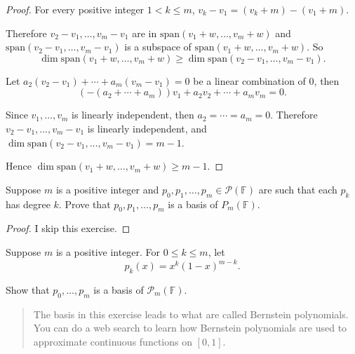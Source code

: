 \begin{proof}
    For every positive integer $1 < k \leq m$, $v_{k} - v_{1} = (v_{k} + m) - (v_{1} + m)$.

    Therefore $v_{2} - v_{1}, \ldots, v_{m} - v_{1}$ are in $\text{span}(v_{1} + w, \ldots, v_{m} + w)$ and $\text{span}(v_{2} - v_{1}, \ldots, v_{m} - v_{1})$ is a subspace of $\text{span}(v_{1} + w, \ldots, v_{m} + w)$. So
    \[
        \dim \text{span}(v_{1}+w, \ldots, v_{m}+w) \geq \dim\text{span}(v_{2} - v_{1}, \ldots, v_{m} - v_{1}).
    \]

    Let $a_{2}(v_{2} - v_{1}) + \cdots + a_{m}(v_{m} - v_{1}) = 0$ be a linear combination of $0$, then
    \[
        (-(a_{2} + \cdots + a_{m}))v_{1} + a_{2}v_{2} + \cdots + a_{m}v_{m} = 0.
    \]

    Since $v_{1}, \ldots, v_{m}$ is linearly independent, then $a_{2} = \cdots = a_{m} = 0$. Therefore $v_{2} - v_{1}, \ldots, v_{m} - v_{1}$ is linearly independent, and $\dim \text{span}(v_{2} - v_{1}, \ldots, v_{m} - v_{1}) = m - 1$.

    Hence $\dim \text{span}(v_{1} + w, \ldots, v_{m} + w)\geq m - 1$.
\end{proof}

\begin{exercise}
    Suppose $m$ is a positive integer and $p_{0}, p_{1}, \ldots, p_{m} \in \mathcal{P}(\mathbb{F})$ are such that each $p_{k}$ has degree $k$. Prove that $p_{0}, p_{1}, \ldots, p_{m}$ is a basis of $P_{m} (\mathbb{F})$.
\end{exercise}

\begin{proof}
    I skip this exercise.
\end{proof}

\begin{exercise}
    Suppose $m$ is a positive integer. For $0 \leq k \leq m$, let
    \[
        p_{k}(x) = x^{k}{(1-x)}^{m-k}.
    \]

    Show that $p_{0}, \ldots, p_{m}$ is a basis of $\mathcal{P}_{m}(\mathbb{F})$.
\end{exercise}

\begin{quote}
    The basis in this exercise leads to what are called Bernstein polynomials. You can do a web search to learn how Bernstein polynomials are used to approximate continuous functions on $\left[0,1\right]$.
\end{quote}

